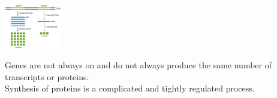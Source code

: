 \begin{minipage}{0.38\linewidth}
    \includegraphics[width=25mm]{src/Images/biosynthesis_of_protein.png}\\ 
\end{minipage}
\begin{minipage}{0.62\linewidth}
Genes are not always on and do not always produce the same number of transcripts or proteins.\\

Synthesis of proteins is a complicated and tightly regulated process.
\end{minipage}


